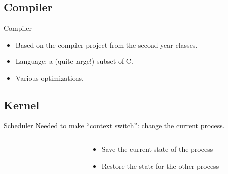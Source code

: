 \documentclass{beamer}
\begin{document}
    \subsection{Compiler}

    \begin{frame}{Compiler}
      \begin{itemize}
        \item Based on the compiler project from the second-year classes.
        \item Language: a (quite large!) subset of C.
        \item Various optimizations.
      \end{itemize}
    \end{frame}

    
    \subsection{Kernel}
    \begin{frame}{Scheduler}
      Needed to make ``context switch'': change the current process.

      \begin{columns}
        \begin{column}{0.4\textwidth}
          \begin{figure}
            \centering
          \end{figure}
        \end{column}
        \begin{column}{0.6\textwidth}
          \begin{itemize}
            \item Save the current state of the process
            \item Restore the state for the other process
          \end{itemize}

        \end{column}
      \end{columns}

    \end{frame}
\end{document}
